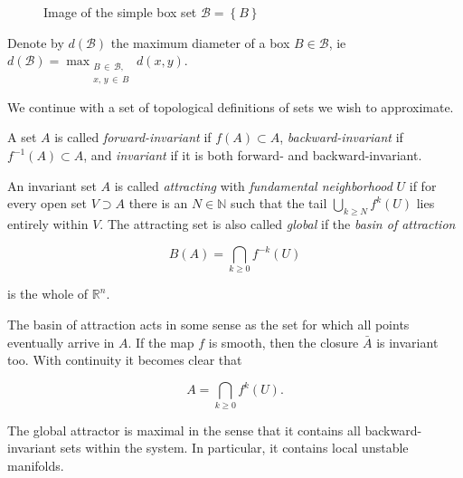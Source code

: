 \begin{figure}[ht]
    \caption{Image of the simple box set $\mathcal{B} = \left\{ B \right\}$}
    \label{fig:boximage}
\end{figure}

\begin{definition}
    Denote by $d(\mathcal{B})$ the maximum diameter of a box $B \in \mathcal{B}$, ie 
    $d(\mathcal{B}) = \max_{\substack{B\, \in\, \mathcal{B},\\ x,\, y\, \in\, B}} d(x, y)$. 
\end{definition}

We continue with a set of topological definitions of sets we wish to approximate.

\begin{definition}
    \cite*{algGAIO} A set $A$ is called \emph{forward-invariant} if $f(A) \subset A$, 
    \emph{backward-invariant} if $f^{-1}(A) \subset A$, and \emph{invariant} if it is
    both forward- and backward-invariant.
\end{definition}

\begin{definition}
    \cite*{subalg} An invariant set $A$ is called \emph{attracting} with \emph{fundamental neighborhood}
    $U$ if for every open set $V \supset A$ there is an $N \in \mathbb{N}$ such that the tail 
    $\bigcup_{k \geq N} f^k(U)$ lies entirely within $V$. The attracting 
    set is also called \emph{global} if the \emph{basin of attraction} 
    
    \begin{equation}\label{eq:globattr}
        B(A) = \bigcap\limits_{k \geq 0} f^{-k}(U)
    \end{equation}

    is the whole of $\mathbb{R}^n$.
\end{definition}

The basin of attraction acts in some sense as the set for which all points eventually arrive
in $A$. If the map $f$ is smooth, then the closure $\bar{A}$ is invariant too. With continuity 
it becomes clear that

\begin{equation}
    A = \bigcap\limits_{k \geq 0} f^k(U).
\end{equation}

The global attractor is maximal in the sense that it contains all backward-invariant 
sets within the system. In particular, it contains local unstable manifolds.

